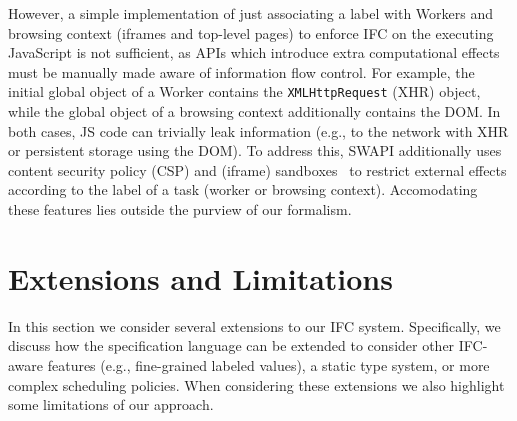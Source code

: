\documentclass{sigplanconf}
\newcommand{\Red}[1]{{\color{red} #1}}
\newcommand{\tocite}[1]{\Red{\cite{#1}}}
\begin{document}
However, a simple implementation of just associating a label with
Workers and browsing context (iframes and top-level pages) to enforce
IFC on the executing JavaScript is not sufficient, as APIs which
introduce extra computational effects must be manually made aware of information flow
control.
%
For example, the initial global object of a Worker contains the
\texttt{XMLHttpRequest} (XHR) object, while the global object of a
browsing context additionally contains the DOM.
%
In both cases, JS code can trivially leak information (e.g., to the
network with XHR or persistent storage using the DOM).
%
To address this, SWAPI additionally uses content security policy (CSP) and
(iframe) sandboxes~\tocite{} to restrict external effects according to
the label of a task (worker or browsing context).  Accomodating these
features lies outside the purview of our formalism.

\section{Extensions and Limitations}
\label{sec:extensions}

In this section we consider several extensions to our IFC system.
%
Specifically, we discuss how the specification language can be
extended to consider other IFC-aware features (e.g., fine-grained
labeled values), a static type system, or more complex scheduling
policies.
%
When considering these extensions we also highlight some limitations
of our approach.
\end{document}
